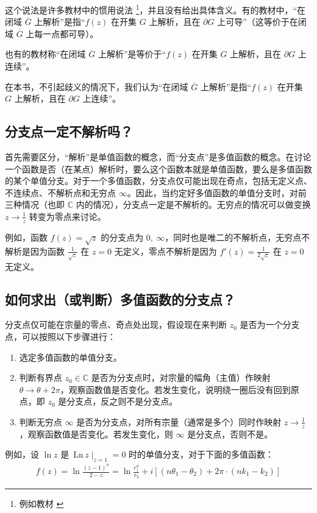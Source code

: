 \documentclass[UTF8]{report}
\def\Ln{\mathrm{\,Ln\,}}
\def\C{\mathbb{C}}
\theoremstyle{MyLineTheoremStyle} %
\theoremstyle{MyBlockTheoremStyle} %
\theoremstyle{MySubsubsectionStyle} %
\begin{document}
这个说法是许多教材中的惯用说法 \footnote{例如教材 \cite{数学物理方法}}，并且没有给出具体含义。有的教材中，“在闭域 $\overline{G}$ 上解析”是指“$f(z)$ 在开集 $G$ 上解析，且在 $\partial G$ 上可导”（这等价于在闭域 $\overline{G}$ 上每一点都可导）。

也有的教材称“在闭域 $\overline{G}$ 上解析”是等价于“$f(z)$ 在开集 $G$ 上解析，且在 $\partial G$ 上连续”。

在本书，不引起歧义的情况下，我们认为“在闭域 $\overline{G} $ 上解析”是指“$f(z)$ 在开集 $G$ 上解析，且在 $\partial G$ 上连续”。

\subsection{分支点一定不解析吗？}
首先需要区分，“解析”是单值函数的概念，而“分支点”是多值函数的概念。在讨论一个函数是否（在某点）解析时，要么这个函数本就是单值函数，要么是多值函数的某个单值分支。对于一个多值函数，分支点仅可能出现在奇点，包括无定义点、不连续点、不解析点和无穷点 $\infty$。因此，当约定好多值函数的单值分支时，对前三种情况（也即 $\C$ 内的情况），分支点一定是不解析的。无穷点的情况可以做变换 $z \to \frac{1}{z}$ 转变为零点来讨论。

例如，函数 $f(z) = \sqrt{z}$ 的分支点为 ${0,\ \infty}$，同时也是唯二的不解析点，无穷点不解析是因为函数 $\frac{1}{\sqrt{z}}$ 在 $z = 0$ 无定义，零点不解析是因为 $f'(z) = \frac{1}{2\sqrt{z}}$ 在 $z = 0$ 无定义。

\subsection{如何求出（或判断）多值函数的分支点？}

{\color{red} 分支点仅可能在宗量的零点、奇点处出现}，假设现在来判断 $z_0$ 是否为一个分支点，可以按照以下步骤进行：
\begin{enumerate}
\item 选定多值函数的单值分支。
\item 判断有界点 $z_0 \in \C$ 是否为分支点时，对宗量的幅角（主值）作映射 $\theta \to  \theta + 2 \pi$，观察函数值是否变化。若发生变化，说明绕一圈后没有回到原点，即 $z_0$ 是分支点，反之则不是分支点。
\item 判断无穷点 $\infty$ 是否为分支点，对所有宗量（通常是多个）同时作映射 $z \to \frac{1}{z}$，观察函数值是否变化。若发生变化，则 $\infty$ 是分支点，否则不是。
\end{enumerate}

例如，设 $\ln z$ 是 $\Ln z \mid_{z = 1} = 0$ 时的单值分支，对于下面的多值函数：
\begin{gather}
    f(z) = \ln \frac{(z-1)^n}{2-z} = \ln \frac{r_1^n}{r_2} + i\left[ (n \theta_1 - \theta_2) + 2\pi \cdot (n k_1 - k_2) \right]
\end{gather}
\end{document}
